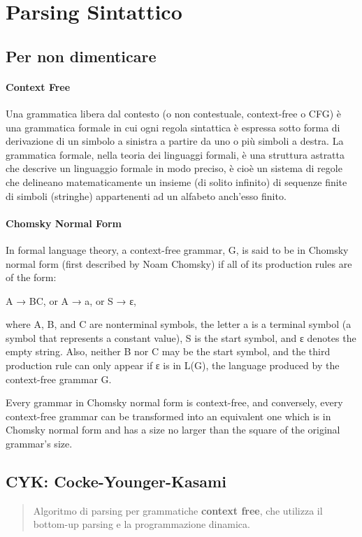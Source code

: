 \chapter{Parsing Sintattico}

\section{Per non dimenticare}
    \subsubsection{Context Free}
    Una grammatica libera dal contesto (o non contestuale, context-free o CFG) è una grammatica formale in cui ogni regola sintattica è espressa sotto forma di derivazione di un simbolo a sinistra a partire da uno o più simboli a destra.
    La grammatica formale, nella teoria dei linguaggi formali, è una struttura astratta che descrive un linguaggio formale in modo preciso, è cioè un sistema di regole che delineano matematicamente un insieme (di solito infinito) di sequenze finite di simboli (stringhe) appartenenti ad un alfabeto anch'esso finito.
    \subsubsection{Chomsky Normal Form}
    In formal language theory, a context-free grammar, G, is said to be in Chomsky normal form (first described by Noam Chomsky) if all of its production rules are of the form:
    
        A → BC,   or
        A → a,   or
        S → ε,
    
    where A, B, and C are nonterminal symbols, the letter a is a terminal symbol (a symbol that represents a constant value), S is the start symbol, and ε denotes the empty string. Also, neither B nor C may be the start symbol, and the third production rule can only appear if ε is in L(G), the language produced by the context-free grammar G.
    
    Every grammar in Chomsky normal form is context-free, and conversely, every context-free grammar can be transformed into an equivalent one which is in Chomsky normal form and has a size no larger than the square of the original grammar's size.

\section{CYK: Cocke-Younger-Kasami}
\begin{abstract}
Algoritmo di parsing per grammatiche \textbf{context free}, che utilizza il bottom-up parsing e la programmazione dinamica.
\end{abstract}


